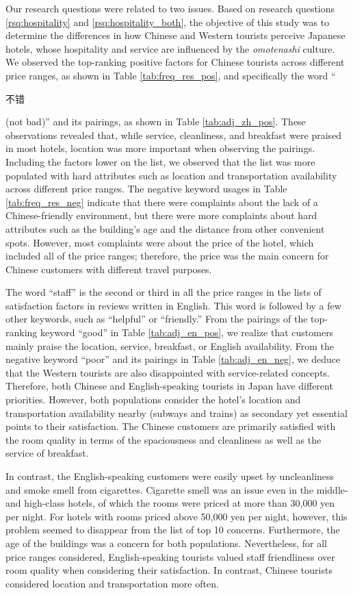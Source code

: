 \documentclass[smallextended,natbib]{svjour3}       %
\begin{document}
    Our research questions were related to two issues. Based on research questions \ref{rsq:hospitality} and \ref{rsq:hospitality_both}, the objective of this study was to determine the differences in how Chinese and Western tourists perceive Japanese hotels, whose hospitality and service are influenced by the \textit{omotenashi} culture. We observed the top-ranking positive factors for Chinese tourists across different price ranges, as shown in Table \ref{tab:freq_res_pos}, and specifically the word ``\begin{CJK}{UTF8}{gbsn}不错\end{CJK} (not bad)'' and its pairings, as shown in Table \ref{tab:adj_zh_pos}. These observations revealed that, while service, cleanliness, and breakfast were praised in most hotels, location was more important when observing the pairings. Including the factors lower on the list, we observed that the list was more populated with hard attributes such as location and transportation availability across different price ranges. The negative keyword usages in Table \ref{tab:freq_res_neg} indicate that there were complaints about the lack of a Chinese-friendly environment, but there were more complaints about hard attributes such as the building's age and the distance from other convenient spots. However, most complaints were about the price of the hotel, which included all of the price ranges; therefore, the price was the main concern for Chinese customers with different travel purposes.

    The word ``staff'' is the second or third in all the price ranges in the lists of satisfaction factors in reviews written in English. This word is followed by a few other keywords, such as ``helpful'' or ``friendly.'' From the pairings of the top-ranking keyword ``good'' in Table \ref{tab:adj_en_pos}, we realize that customers mainly praise the location, service, breakfast, or English availability. From the negative keyword ``poor'' and its pairings in Table \ref{tab:adj_en_neg}, we deduce that the Western tourists are also disappointed with service-related concepts. Therefore, both Chinese and English-speaking tourists in Japan have different priorities. However, both populations consider the hotel's location and transportation availability nearby (subways and trains) as secondary yet essential points to their satisfaction. The Chinese customers are primarily satisfied with the room quality in terms of the spaciousness and cleanliness as well as the service of breakfast.

    In contrast, the English-speaking customers were easily upset by uncleanliness and smoke smell from cigarettes. Cigarette smell was an issue even in the middle- and high-class hotels, of which the rooms were priced at more than 30,000 yen per night. For hotels with rooms priced above 50,000 yen per night, however, this problem seemed to disappear from the list of top 10 concerns. Furthermore, the age of the buildings was a concern for both populations. Nevertheless, for all price ranges considered, English-speaking tourists valued staff friendliness over room quality when considering their satisfaction. In contrast, Chinese tourists considered location and transportation more often.
\end{document}
